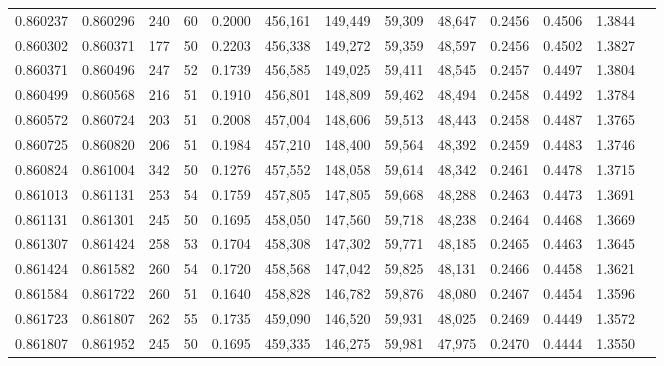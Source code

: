 \begin{tabular}{rrrrrrrrrrrrr}
0.860237 & 0.860296 &   240 &  60 &                                     0.2000 & 456,161 & 149,449 &  59,309 &  48,647 & 0.2456 & 0.4506 & 1.3844 \\
0.860302 & 0.860371 &   177 &  50 &                                     0.2203 & 456,338 & 149,272 &  59,359 &  48,597 & 0.2456 & 0.4502 & 1.3827 \\
0.860371 & 0.860496 &   247 &  52 &                                     0.1739 & 456,585 & 149,025 &  59,411 &  48,545 & 0.2457 & 0.4497 & 1.3804 \\
0.860499 & 0.860568 &   216 &  51 &                                     0.1910 & 456,801 & 148,809 &  59,462 &  48,494 & 0.2458 & 0.4492 & 1.3784 \\
0.860572 & 0.860724 &   203 &  51 &                                     0.2008 & 457,004 & 148,606 &  59,513 &  48,443 & 0.2458 & 0.4487 & 1.3765 \\
0.860725 & 0.860820 &   206 &  51 &                                     0.1984 & 457,210 & 148,400 &  59,564 &  48,392 & 0.2459 & 0.4483 & 1.3746 \\
0.860824 & 0.861004 &   342 &  50 &                                     0.1276 & 457,552 & 148,058 &  59,614 &  48,342 & 0.2461 & 0.4478 & 1.3715 \\
0.861013 & 0.861131 &   253 &  54 &                                     0.1759 & 457,805 & 147,805 &  59,668 &  48,288 & 0.2463 & 0.4473 & 1.3691 \\
0.861131 & 0.861301 &   245 &  50 &                                     0.1695 & 458,050 & 147,560 &  59,718 &  48,238 & 0.2464 & 0.4468 & 1.3669 \\
0.861307 & 0.861424 &   258 &  53 &                                     0.1704 & 458,308 & 147,302 &  59,771 &  48,185 & 0.2465 & 0.4463 & 1.3645 \\
0.861424 & 0.861582 &   260 &  54 &                                     0.1720 & 458,568 & 147,042 &  59,825 &  48,131 & 0.2466 & 0.4458 & 1.3621 \\
0.861584 & 0.861722 &   260 &  51 &                                     0.1640 & 458,828 & 146,782 &  59,876 &  48,080 & 0.2467 & 0.4454 & 1.3596 \\
0.861723 & 0.861807 &   262 &  55 &                                     0.1735 & 459,090 & 146,520 &  59,931 &  48,025 & 0.2469 & 0.4449 & 1.3572 \\
0.861807 & 0.861952 &   245 &  50 &                                     0.1695 & 459,335 & 146,275 &  59,981 &  47,975 & 0.2470 & 0.4444 & 1.3550 \\

\end{tabular}
